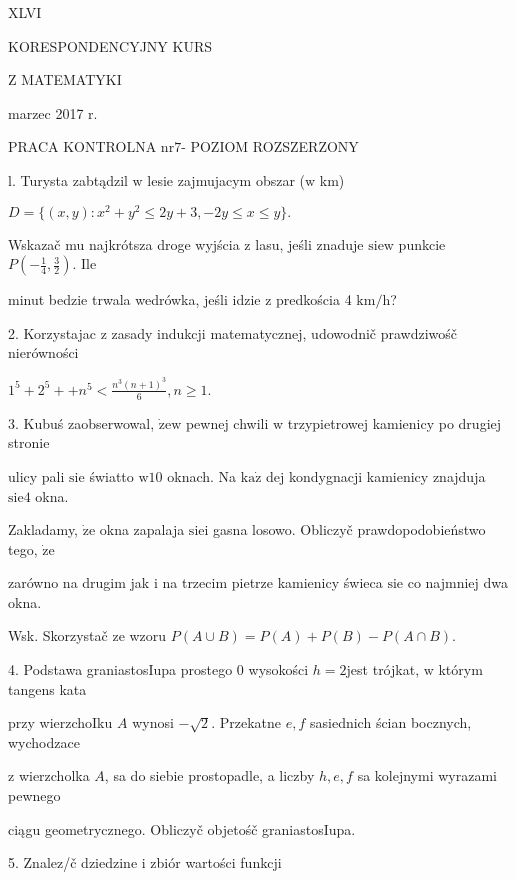 \documentclass[a4paper,12pt]{article}
\begin{document}
XLVI

KORESPONDENCYJNY KURS

Z MATEMATYKI

marzec 2017 r.

PRACA KONTROLNA $\mathrm{n}\mathrm{r} 7$- POZIOM ROZSZERZONY

l. Turysta zabtądzil $\mathrm{w}$ lesie zajmujacym obszar ($\mathrm{w}$ km)

$D=\{(x,y):x^{2}+y^{2}\leq 2y+3,-2y\leq x\leq y\}.$

Wskazač mu najkrótsza droge wyjścia $\mathrm{z}$ lasu, jeśli znaduje $\mathrm{s}\mathrm{i}\mathrm{e}\mathrm{w}$ punkcie $P(-\displaystyle \frac{1}{4},\frac{3}{2})$. Ile

minut bedzie trwala wedrówka, jeśli idzie $\mathrm{z}$ predkościa 4 $\mathrm{k}\mathrm{m}/\mathrm{h}$?

2. Korzystajac $\mathrm{z}$ zasady indukcji matematycznej, udowodnič prawdziwośč nierówności

$1^{5}+2^{5}++n^{5}<\displaystyle \frac{n^{3}(n+1)^{3}}{6},n\geq 1.$

3. Kubuś zaobserwowal, $\dot{\mathrm{z}}\mathrm{e}\mathrm{w}$ pewnej chwili $\mathrm{w}$ trzypietrowej kamienicy po drugiej stronie

ulicy pali $\mathrm{s}\mathrm{i}\mathrm{e}$ światto $\mathrm{w}10$ oknach. Na $\mathrm{k}\mathrm{a}\dot{\mathrm{z}}$ dej kondygnacji kamienicy znajduja $\mathrm{s}\mathrm{i}\mathrm{e}4$ okna.

Zakladamy, $\dot{\mathrm{z}}\mathrm{e}$ okna zapalaja $\mathrm{s}\mathrm{i}\mathrm{e}\mathrm{i}$ gasna losowo. Obliczyč prawdopodobieństwo tego, $\dot{\mathrm{z}}\mathrm{e}$

zarówno na drugim jak $\mathrm{i}$ na trzecim pietrze kamienicy świeca $\mathrm{s}\mathrm{i}\mathrm{e}$ co najmniej dwa okna.

Wsk. Skorzystač ze wzoru $P(A\cup B)=P(A)+P(B)-P(A\cap B).$

4. Podstawa graniastosIupa prostego $0$ wysokości $h=2$jest trójkat, $\mathrm{w}$ którym tangens kata

przy wierzchoIku $A$ wynosi $-\sqrt{2}$. Przekatne $e, f$ sasiednich ścian bocznych, wychodzace

$\mathrm{z}$ wierzcholka $A$, sa do siebie prostopadle, a liczby $h, e, f$ sa kolejnymi wyrazami pewnego

ciągu geometrycznego. Obliczyč objetośč graniastosIupa.

5. Znalez/č dziedzine $\mathrm{i}$ zbiór wartości funkcji
\end{document}

